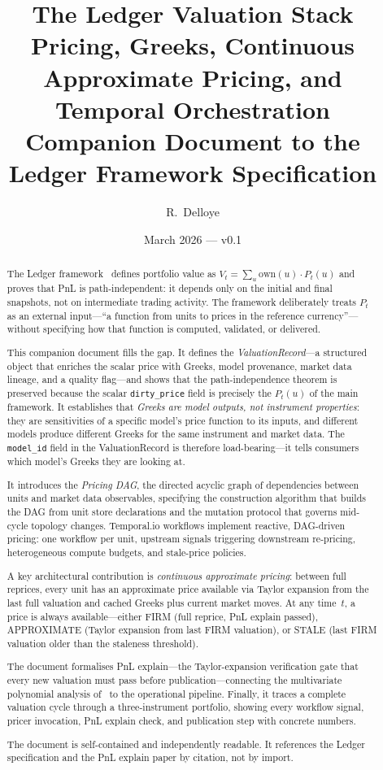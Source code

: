 \documentclass[11pt,a4paper]{article}
\title{The Ledger Valuation Stack\\[6pt]
\large Pricing, Greeks, Continuous Approximate Pricing, and Temporal Orchestration\\[4pt]
\normalsize Companion Document to the Ledger Framework Specification}
\author{R.\ Delloye}
\date{March 2026 --- v0.1}
\begin{document}
\maketitle

\begin{abstract}
The Ledger framework~\cite{ledger} defines portfolio value as $V_t = \sum_u \mathrm{own}(u) \cdot P_t(u)$ and proves that PnL is path-independent: it depends only on the initial and final snapshots, not on intermediate trading activity.  The framework deliberately treats $P_t$ as an external input---``a function from units to prices in the reference currency''---without specifying how that function is computed, validated, or delivered.

This companion document fills the gap.  It defines the \emph{ValuationRecord}---a structured object that enriches the scalar price with Greeks, model provenance, market data lineage, and a quality flag---and shows that the path-independence theorem is preserved because the scalar \texttt{dirty\_price} field is precisely the $P_t(u)$ of the main framework.  It establishes that \emph{Greeks are model outputs, not instrument properties}: they are sensitivities of a specific model's price function to its inputs, and different models produce different Greeks for the same instrument and market data.  The \texttt{model\_id} field in the ValuationRecord is therefore load-bearing---it tells consumers which model's Greeks they are looking at.

It introduces the \emph{Pricing DAG}, the directed acyclic graph of dependencies between units and market data observables, specifying the construction algorithm that builds the DAG from unit store declarations and the mutation protocol that governs mid-cycle topology changes.  Temporal.io workflows implement reactive, DAG-driven pricing: one workflow per unit, upstream signals triggering downstream re-pricing, heterogeneous compute budgets, and stale-price policies.

A key architectural contribution is \emph{continuous approximate pricing}: between full reprices, every unit has an approximate price available via Taylor expansion from the last full valuation and cached Greeks plus current market moves.  At any time~$t$, a price is always available---either FIRM (full reprice, PnL explain passed), APPROXIMATE (Taylor expansion from last FIRM valuation), or STALE (last FIRM valuation older than the staleness threshold).

The document formalises PnL explain---the Taylor-expansion verification gate that every new valuation must pass before publication---connecting the multivariate polynomial analysis of~\cite{pnl_explain} to the operational pipeline.  Finally, it traces a complete valuation cycle through a three-instrument portfolio, showing every workflow signal, pricer invocation, PnL explain check, and publication step with concrete numbers.

The document is self-contained and independently readable.  It references the Ledger specification and the PnL explain paper by citation, not by import.
\end{abstract}
\end{document}
